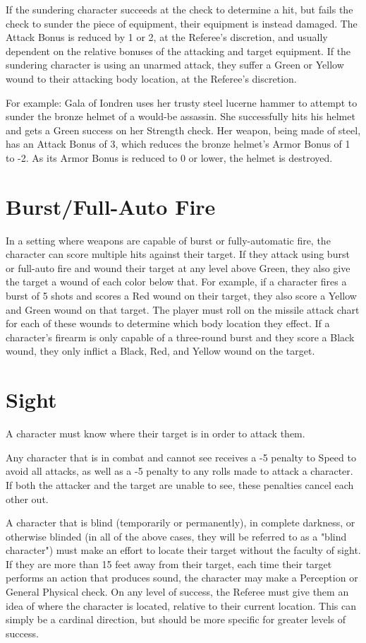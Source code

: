 \documentclass[oneside]{book}
\begin{document}
\begin{multicols}{2}
If the sundering character succeeds at the check to determine a hit, but fails the check to sunder the piece of equipment, their equipment is instead damaged. The Attack Bonus is reduced by 1 or 2, at the Referee's discretion, and usually dependent on the relative bonuses of the attacking and target equipment. If the sundering character is using an unarmed attack, they suffer a Green or Yellow wound to their attacking body location, at the Referee's discretion.

For example: Gala of Iondren uses her trusty steel lucerne hammer to attempt to sunder the bronze helmet of a would-be assassin. She successfully hits his helmet and gets a Green success on her Strength check. Her weapon, being made of steel, has an Attack Bonus of 3, which reduces the bronze helmet's Armor Bonus of 1 to -2. As its Armor Bonus is reduced to 0 or lower, the helmet is destroyed. 

\section{Burst/Full-Auto Fire}
In a setting where weapons are capable of burst or fully-automatic fire, the character can score multiple hits against their target. If they attack using burst or full-auto fire and wound their target at any level above Green, they also give the target a wound of each color below that. For example, if a character fires a burst of 5 shots and scores a Red wound on their target, they also score a Yellow and Green wound on that target. The player must roll on the missile attack chart for each of these wounds to determine which body location they effect. If a character's firearm is only capable of a three-round burst and they score a Black wound, they only inflict a Black, Red, and Yellow wound on the target. 

\section{Sight}
A character must know where their target is in order to attack them. 

Any character that is in combat and cannot see receives a -5 penalty to Speed to avoid all attacks, as well as a -5 penalty to any rolls made to attack a character. If both the attacker and the target are unable to see, these penalties cancel each other out. 

A character that is blind (temporarily or permanently), in complete darkness, or otherwise blinded (in all of the above cases, they will be referred to as a "blind character") must make an effort to locate their target without the faculty of sight. If they are more than 15 feet away from their target, each time their target performs an action that produces sound, the character may make a Perception or General Physical check. On any level of success, the Referee must give them an idea of where the character is located, relative to their current location. This can simply be a cardinal direction, but should be more specific for greater levels of success. 


\end{multicols}
\end{document}
